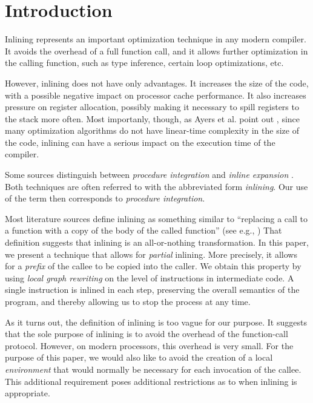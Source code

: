 \section{Introduction}

Inlining represents an important optimization technique in any modern
compiler.  It avoids the overhead of a full function call, and it
allows further optimization in the calling function, such as type
inference, certain loop optimizations, etc.

However, inlining does not have only advantages.  It increases the
size of the code, with a possible negative impact on processor cache
performance.  It also increases pressure on register allocation,
possibly making it necessary to spill registers to the stack more
often.  Most importanly, though, as Ayers et al. point out
\cite{Ayers:1997:AI:258915.258928, Ayers:1997:AI:258916.258928}, since
many optimization algorithms do not have linear-time complexity in the
size of the code, inlining can have a serious impact on the execution
time of the compiler.

Some sources distinguish between \emph{procedure integration} and
\emph{inline expansion} \cite{Muchnick:1998:ACD:286076}.  Both
techniques are often referred to with the abbreviated form
\emph{inlining}.  Our use of the term then corresponds to
\emph{procedure integration}.

Most literature sources define inlining as something similar to
``replacing a call to a function with a copy of the body of the called
function'' (see e.g., \cite{Scheifler:1977:AIS:359810.359830}) That
definition suggests that inlining is an all-or-nothing transformation.
In this paper, we present a technique that allows for \emph{partial}
inlining.  More precisely, it allows for a \emph{prefix} of the callee
to be copied into the caller.  We obtain this property by using
\emph{local graph rewriting} on the level of instructions in
intermediate code.  A single instruction is inlined in each step,
preserving the overall semantics of the program, and thereby allowing
us to stop the process at any time.

As it turns out, the definition of inlining is too vague for our
purpose.  It suggests that the sole purpose of inlining is to avoid
the overhead of the function-call protocol.  However, on modern
processors, this overhead is very small.  For the purpose of this
paper, we would also like to avoid the creation of a local
\emph{environment} that would normally be necessary for each
invocation of the callee.  This additional requirement poses
additional restrictions as to when inlining is appropriate.

